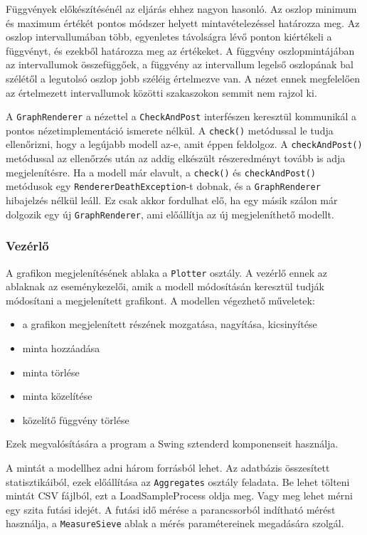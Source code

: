 Függvények előkészítésénél az eljárás ehhez nagyon hasonló.
Az oszlop minimum és maximum értékét pontos módszer helyett mintavételezéssel határozza meg. Az oszlop intervallumában több, egyenletes távolságra lévő ponton kiértékeli a függvényt, és ezekből határozza meg az értékeket.
A függvény oszlopmintájában az intervallumok összefüggőek, a függvény az intervallum legelső oszlopának bal szélétől a legutolsó oszlop jobb széléig értelmezve van.
A nézet ennek megfelelően az értelmezett intervallumok közötti szakaszokon semmit nem rajzol ki.

A \texttt{GraphRenderer} a nézettel a \texttt{CheckAndPost} interfészen keresztül kommunikál a pontos nézetimplementáció ismerete nélkül.
A \texttt{check()} metódussal le tudja ellenőrizni, hogy a legújabb modell az-e, amit éppen feldolgoz.
A \texttt{checkAndPost()} metódussal az ellenőrzés után az addig elkészült részeredményt tovább is adja megjelenítésre.
Ha a modell már elavult, a \texttt{check()} és \texttt{checkAndPost()} metódusok egy \texttt{RendererDeathException}-t dobnak, és a \texttt{GraphRenderer} hibajelzés nélkül leáll.
Ez csak akkor fordulhat elő, ha egy másik szálon már dolgozik egy új \texttt{GraphRenderer}, ami előállítja az új megjeleníthető modellt.

\subsubsection{Vezérlő}

A grafikon megjelenítésének ablaka a \texttt{Plotter} osztály.
A vezérlő ennek az ablaknak az eseménykezelői, amik a modell módosításán keresztül tudják módosítani a megjelenített grafikont.
A modellen végezhető műveletek:
\begin{itemize}
\item a grafikon megjelenített részének mozgatása, nagyítása, kicsinyítése
\item minta hozzáadása
\item minta törlése
\item minta közelítése
\item közelítő függvény törlése
\end{itemize}
Ezek megvalósítására a program a Swing sztenderd komponenseit használja.

A mintát a modellhez adni három forrásból lehet.
Az adatbázis összesített statisztikáiból, ezek előállítása az \texttt{Aggregates} osztály feladata.
Be lehet tölteni mintát CSV fájlból, ezt a LoadSampleProcess oldja meg.
Vagy meg lehet mérni egy szita futási idejét.
A futási idő mérése a parancssorból indítható mérést használja, a \texttt{MeasureSieve} ablak a mérés paramétereinek megadására szolgál.

